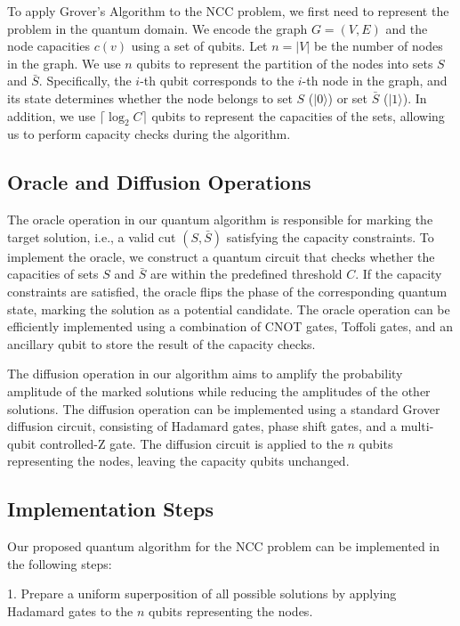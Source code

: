 To apply Grover's Algorithm to the NCC problem, we first need to represent the problem in the quantum domain. We encode the graph $G=(V, E)$ and the node capacities $c(v)$ using a set of qubits. Let $n = |V|$ be the number of nodes in the graph. We use $n$ qubits to represent the partition of the nodes into sets $S$ and $\bar{S}$. Specifically, the $i$-th qubit corresponds to the $i$-th node in the graph, and its state determines whether the node belongs to set $S$ ($|0\rangle$) or set $\bar{S}$ ($|1\rangle$). In addition, we use $\lceil \log_2 C \rceil$ qubits to represent the capacities of the sets, allowing us to perform capacity checks during the algorithm.

\subsection{Oracle and Diffusion Operations}

The oracle operation in our quantum algorithm is responsible for marking the target solution, i.e., a valid cut $(S, \bar{S})$ satisfying the capacity constraints. To implement the oracle, we construct a quantum circuit that checks whether the capacities of sets $S$ and $\bar{S}$ are within the predefined threshold $C$. If the capacity constraints are satisfied, the oracle flips the phase of the corresponding quantum state, marking the solution as a potential candidate. The oracle operation can be efficiently implemented using a combination of CNOT gates, Toffoli gates, and an ancillary qubit to store the result of the capacity checks.

The diffusion operation in our algorithm aims to amplify the probability amplitude of the marked solutions while reducing the amplitudes of the other solutions. The diffusion operation can be implemented using a standard Grover diffusion circuit, consisting of Hadamard gates, phase shift gates, and a multi-qubit controlled-Z gate. The diffusion circuit is applied to the $n$ qubits representing the nodes, leaving the capacity qubits unchanged.

\subsection{Implementation Steps}

Our proposed quantum algorithm for the NCC problem can be implemented in the following steps:

1. Prepare a uniform superposition of all possible solutions by applying Hadamard gates to the $n$ qubits representing the nodes.

